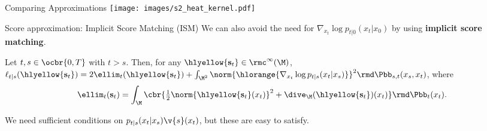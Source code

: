    \begin{frame}{Comparing Approximations}
       \centering
       \texttt{[image: images/s2\_heat\_kernel.pdf]}
   \end{frame}
   
   \begin{frame}{Score approximation: Implicit Score Matching (ISM)}
       We can also avoid the need for $\nabla_{x_t} \log p_{t|0}(x_t|x_0)$ by using \textbf{implicit score matching}.
       \begin{proposition}{}{}
         \label{prop:implicit_der}
         Let $t, s \in \ocbr{0,T}$ with $t>s$. Then, for any
         $\hlyellow{\mathbf{s}_t}\in \rmc^\infty(\M)$,
         $\ell_{t|s}(\hlyellow{\mathbf{s}_t}) = 2 \ellim_t(\hlyellow{\mathbf{s}_t}) + \int_{\M^2}
         \norm{\hlorange{\nabla_{x_t} \log p_{t|s}(x_t|x_s)}}^2 \rmd
         \Pbb_{s,t}(x_s,x_t)$, where
         \begin{equation}
           \label{eq:ism_loss}
             \ellim_t(\mathbf{s}_t) = \int_\M \cbr{
             \tfrac{1}{2}\norm{\hlyellow{\mathbf{s}_t}(x_t)}^2 + \dive_{\M}(\hlyellow{\mathbf{s}_t})(x_t) }
             \rmd \Pbb_t(x_t).
         \end{equation}
       \end{proposition}
   We need sufficient conditions on $p_{t|s}(x_t | x_s) \v{s}(x_t)$, but these are easy to satisfy.
   
   \end{frame}
   
   
   
